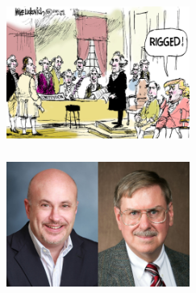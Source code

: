 \documentclass[twoside]{article}
\begin{document}
\begin{titlepage}
    \centering
    \vskip2cm
    \centering
    \begin{figure}[H]
      \centering
      \begin{subfigure}{.4\textwidth}
        \centering
        \includegraphics[width=6cm,height=4.5cm]{images/frontpage/Rigged.jpg}
        \end{subfigure}%
        \begin{subfigure}{.4\textwidth}
          \centering
          \includegraphics[width=6cm,height=4.5cm]{images/frontpage/House.jpg}
        \end{subfigure}%
      \end{figure}
\end{titlepage}
\tableofcontents
\newpage
\end{document}
